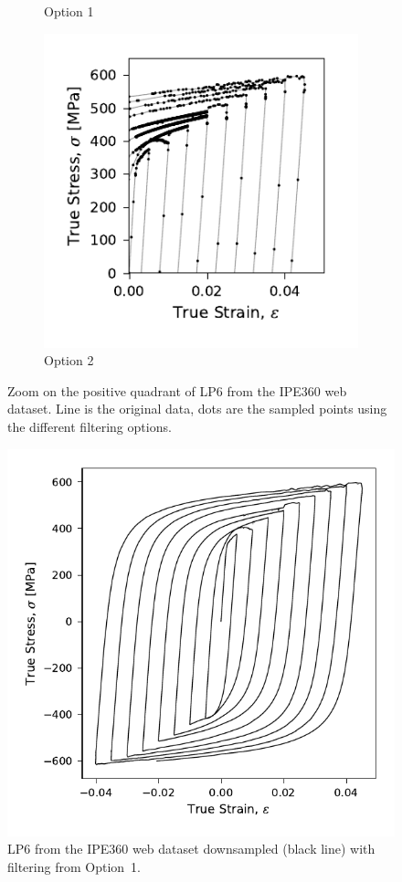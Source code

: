 \documentclass[a4paper,11pt]{article}
\begin{document}
\begin{figure}
\begin{subfigure}[b]{0.49\linewidth}
        \caption{Option 1}
    \end{subfigure}

    \begin{subfigure}[b]{0.49\linewidth}
        \centering
        \includegraphics{LP6_dots_WP3_IPE360_C_CRM8_op2_.pdf}
        \caption{Option 2}
    \end{subfigure}
    \caption{Zoom on the positive quadrant of LP6 from the IPE360 web dataset. Line is the original data, dots are the sampled points using the different filtering options.}
    \label{fig:filtering-compare-dots}
\end{figure}

\begin{figure}
    \centering
    \includegraphics{LP6_downsampled_WP3_IPE360_C_CRM8_op3_.pdf}
    \caption{LP6 from the IPE360 web dataset downsampled (black line) with filtering from Option~1.}
    \label{fig:filtering-compare-downsampled}
\end{figure}
\end{document}
